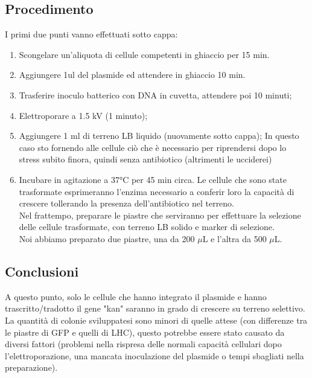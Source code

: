 \documentclass{extarticle}
\begin{document}
\subsection*{Procedimento}
\begin{minipage}{0.50\textwidth} 
    I primi due punti vanno effettuati sotto cappa:
    \begin{enumerate}
        \item Scongelare un'aliquota di cellule competenti in ghiaccio per 15 min.
        \item Aggiungere 1ul del plasmide ed attendere in ghiaccio 10 min.
        \item Trasferire inoculo batterico con DNA in cuvetta, attendere poi 10 minuti;
        \item Elettroporare a 1.5 kV (1 minuto);
        \item Aggiungere 1 ml di terreno LB liquido (nuovamente sotto cappa);
            \subitem In questo caso sto fornendo alle cellule ciò che è necessario per riprendersi dopo
            lo stress subito finora, quindi senza antibiotico (altrimenti le ucciderei)
        \item Incubare in agitazione a 37°C per 45 min circa.
        \subitem Le cellule che sono state trasformate esprimeranno l'enzima necessario a conferir loro la 
        capacità di crescere tollerando la presenza dell'antibiotico nel terreno.\\
        Nel frattempo, preparare le piastre che serviranno per effettuare la selezione delle cellule trasformate, con terreno LB solido e marker di selezione.\\
        Noi abbiamo preparato due piastre, una da 200 $\mu$L e l'altra da 500 $\mu$L.
    \end{enumerate}
    \subsection*{Conclusioni}
    A questo punto, solo le cellule che hanno integrato il plasmide e hanno trascritto/tradotto il gene 
    "kan" saranno in grado di crescere su terreno selettivo. La quantità di colonie sviluppatesi sono minori di quelle attese (con differenze tra le piastre di GFP e quelli di LHC), questo potrebbe essere stato causato da diversi fattori (problemi nella rispresa delle normali capacità cellulari dopo l'elettroporazione, una mancata inoculazione del plasmide o tempi sbagliati nella preparazione).
\end{minipage} \hfill
\end{document}
